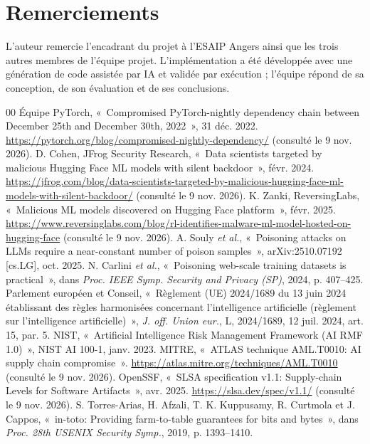 \documentclass[conference]{IEEEtran}
\begin{document}
\section*{Remerciements}
L'auteur remercie l'encadrant du projet à l'ESAIP Angers ainsi que les trois autres membres de l'équipe projet. L'implémentation a été développée avec une génération de code assistée par IA et validée par exécution ; l'équipe répond de sa conception, de son évaluation et de ses conclusions.

\begin{thebibliography}{00}\NoAutoSpacing
{} Équipe PyTorch, «~Compromised PyTorch-nightly dependency chain between December 25th and December 30th, 2022~», 31 déc. 2022. \url{https://pytorch.org/blog/compromised-nightly-dependency/} (consulté le 9 nov. 2026).
 D. Cohen, JFrog Security Research, «~Data scientists targeted by malicious Hugging Face ML models with silent backdoor~», févr. 2024. \url{https://jfrog.com/blog/data-scientists-targeted-by-malicious-hugging-face-ml-models-with-silent-backdoor/} (consulté le 9 nov. 2026).
 K. Zanki, ReversingLabs, «~Malicious ML models discovered on Hugging Face platform~», févr. 2025. \url{https://www.reversinglabs.com/blog/rl-identifies-malware-ml-model-hosted-on-hugging-face} (consulté le 9 nov. 2026).
 A. Souly \emph{et al.}, «~Poisoning attacks on LLMs require a near-constant number of poison samples~», arXiv:2510.07192 [cs.LG], oct. 2025.
 N. Carlini \emph{et al.}, «~Poisoning web-scale training datasets is practical~», dans \emph{Proc. IEEE Symp. Security and Privacy (SP)}, 2024, p. 407--425.
 Parlement européen et Conseil, «~Règlement (UE) 2024/1689 du 13 juin 2024 établissant des règles harmonisées concernant l'intelligence artificielle (règlement sur l'intelligence artificielle)~», \emph{J. off. Union eur.}, L, 2024/1689, 12 juil. 2024, art. 15, par. 5.
 NIST, «~Artificial Intelligence Risk Management Framework (AI RMF 1.0)~», NIST AI 100-1, janv. 2023.
 MITRE, «~ATLAS technique AML.T0010: AI supply chain compromise~». \url{https://atlas.mitre.org/techniques/AML.T0010} (consulté le 9 nov. 2026).
 OpenSSF, «~SLSA specification v1.1: Supply-chain Levels for Software Artifacts~», avr. 2025. \url{https://slsa.dev/spec/v1.1/} (consulté le 9 nov. 2026).
 S. Torres-Arias, H. Afzali, T. K. Kuppusamy, R. Curtmola et J. Cappos, «~in-toto: Providing farm-to-table guarantees for bits and bytes~», dans \emph{Proc. 28th USENIX Security Symp.}, 2019, p. 1393--1410.

\end{thebibliography}
\end{document}
